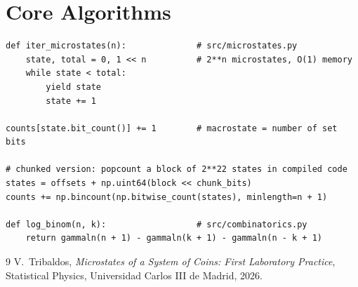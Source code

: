 \documentclass[11pt, a4paper]{article}
\begin{document}
\section{Core Algorithms}
\begin{verbatim}
def iter_microstates(n):              # src/microstates.py
    state, total = 0, 1 << n          # 2**n microstates, O(1) memory
    while state < total:
        yield state
        state += 1

counts[state.bit_count()] += 1        # macrostate = number of set bits

# chunked version: popcount a block of 2**22 states in compiled code
states = offsets + np.uint64(block << chunk_bits)
counts += np.bincount(np.bitwise_count(states), minlength=n + 1)

def log_binom(n, k):                  # src/combinatorics.py
    return gammaln(n + 1) - gammaln(k + 1) - gammaln(n - k + 1)
\end{verbatim}

\begin{thebibliography}{9}
V.~Tribaldos, \emph{Microstates of a System of Coins: First Laboratory Practice}, Statistical Physics, Universidad Carlos III de Madrid, 2026.
\end{thebibliography}
\end{document}
